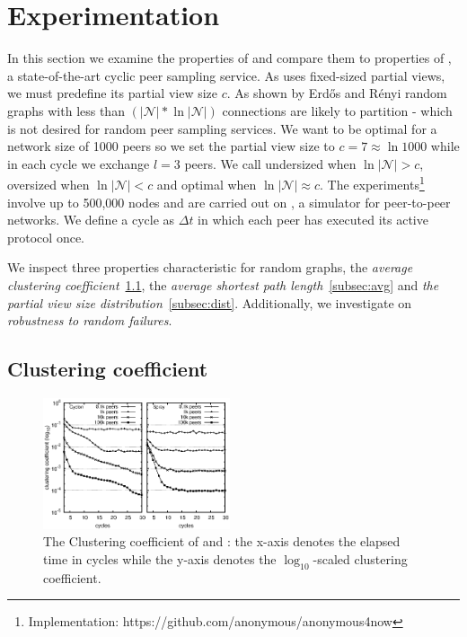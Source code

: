 \section{Experimentation}
\label{sec:experiments}

In this section we examine the properties of \SCAMPLON{} and compare them to
properties of \CYCLON{}, a state-of-the-art cyclic peer sampling service.  As
\CYCLON{} uses fixed-sized partial views, we must predefine its partial view
size $c$.  As shown by Erd{\H o}s and R{\' e}nyi\cite{erdos1959random} random
graphs with less than $(|\mathcal{N}|*\ln|\mathcal{N}|)$ connections are likely
to partition - which is not desired for random peer sampling services.  We want
\CYCLON{} to be optimal for a network size of 1000 peers so we set the partial
view size to $c=7\approx \ln{1000}$ while in each cycle we exchange $l=3$
peers.  We call \CYCLON{} undersized when $\ln{|\mathcal{N}}| > c$, oversized
when $\ln{|\mathcal{N}|} < c$ and optimal when $\ln{|\mathcal{N}|} \approx c$.
The experiments\footnote{Implementation:
  https://github.com/anonymous/anonymous4now} involve up to 500,000 nodes and
are carried out on \PEERSIM{} \cite{peersim}, a simulator for peer-to-peer
networks.  We define a cycle as $\Delta t$ in which each peer has executed its
active protocol once.

We inspect three properties characteristic for random graphs, the \emph{average
  clustering coefficient}~\ref{subsec:cluster}, the \emph{average shortest path
  length}~\ref{subsec:avg} and \emph{the partial view size
  distribution}~\ref{subsec:dist}. Additionally, we investigate on
\emph{robustness to random failures}.

\subsection{Clustering coefficient}
\label{subsec:cluster}

\begin{figure}
  \centering
  \includegraphics[width=0.49\textwidth]{img/cluster.eps}
  \caption{\label{fig:clustering}The Clustering coefficient of \SCAMPLON{} and
      \CYCLON{}: the x-axis denotes the elapsed time in cycles while the y-axis
      denotes the $\log_{10}$-scaled clustering coefficient.
  }
\end{figure}

